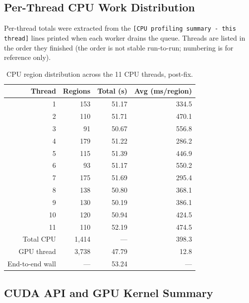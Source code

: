 \documentclass[
	english,
	letterpaper, oneside
]{article}
\begin{document}
\subsection{Per-Thread CPU Work Distribution}

Per-thread totals were extracted from the
\texttt{[CPU profiling summary - this thread]} lines printed when each
worker drains the queue. Threads are listed in the order they finished
(the order is not stable run-to-run; numbering is for reference only).

\begin{table}[H]
    \centering
    \caption{CPU region distribution across the 11 CPU threads, post-fix.}
    \label{tab:cpu-threads-post}
    \begin{tabular}{rrrr}
        \hline
        Thread & Regions & Total (s) & Avg (ms/region) \\
        \hline
         1 & 153 & 51.17 & 334.5 \\
         2 & 110 & 51.71 & 470.1 \\
         3 &  91 & 50.67 & 556.8 \\
         4 & 179 & 51.22 & 286.2 \\
         5 & 115 & 51.39 & 446.9 \\
         6 &  93 & 51.17 & 550.2 \\
         7 & 175 & 51.69 & 295.4 \\
         8 & 138 & 50.80 & 368.1 \\
         9 & 130 & 50.19 & 386.1 \\
        10 & 120 & 50.94 & 424.5 \\
        11 & 110 & 52.19 & 474.5 \\
        \hline
        Total CPU & 1{,}414 & --- & 398.3 \\
        GPU thread & 3{,}738 & 47.79 & 12.8 \\
        \hline
        End-to-end wall & --- & 53.24 & --- \\
        \hline
    \end{tabular}
\end{table}

\subsection{CUDA API and GPU Kernel Summary}
\end{document}
